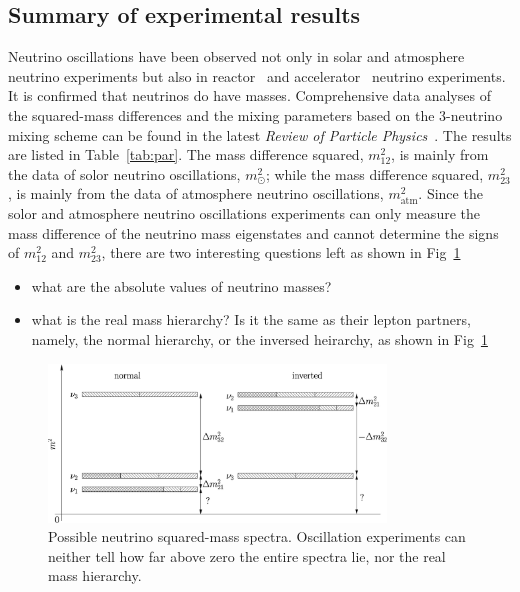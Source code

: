 \subsection{Summary of experimental results}
\label{sec:allo}
Neutrino oscillations have been observed not only in solar and atmosphere neutrino experiments but also in reactor~\cite{Ara05} and accelerator~\cite{Dod06,Agu07} neutrino experiments. It is confirmed that neutrinos do have masses. Comprehensive data analyses of the squared-mass differences and the mixing parameters based on the 3-neutrino mixing scheme can be found in the latest \emph{Review of   Particle Physics}~\cite{PDG07}. The results are listed in Table~\ref{tab:par}. The mass difference squared, $m^{2}_{12}$, is mainly from the data of solor neutrino oscillations, $m^{2}_\odot$; while the mass difference squared, $m^{2}_{23}$, is mainly from the data of atmosphere neutrino oscillations, $m^{2}_{\mbox{atm}}$. Since the solor and atmosphere neutrino oscillations experiments can only measure the mass difference of the neutrino mass eigenstates and cannot determine the signs of $m^{2}_{12}$ and $m^{2}_{23}$, there are two interesting questions left as shown in Fig~\ref{fig:hie}
\begin{itemize}
\item what are the absolute values of neutrino masses?
\item what is the real mass hierarchy? Is it the same as their lepton partners, namely, the normal hierarchy, or the inversed heirarchy, as shown in Fig~\ref{fig:hie}
\end{itemize}
\begin{figure}[tbhp]
  \centering
  \includegraphics[width=0.8\textwidth]{massHierarchy.eps}  
  \caption{Possible neutrino squared-mass spectra. Oscillation     experiments can neither tell how far above zero the entire spectra     lie, nor the real mass hierarchy.}
  \label{fig:hie}
\end{figure}

